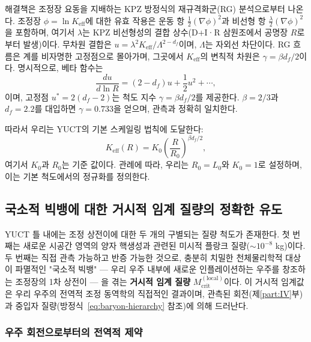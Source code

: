 \documentclass[11pt,a4paper]{article}
\newcommand{\Keff}{K_{\mathrm{eff}}}
\newcommand{\Lzero}{L_0}
\begin{document}
	해결책은 조정장 요동을 지배하는 KPZ 방정식의 재규격화군(RG) 분석으로부터 나온다. 조정장 \(\phi = \ln \Keff\)에 대한 유효 작용은 운동 항 \(\frac{1}{2}(\nabla \phi)^2\)과 비선형 항 \(\frac{\lambda}{2}(\nabla \phi)^2\)을 포함하며, 여기서 \(\lambda\)는 KPZ 비선형성의 결합 상수(D+I·R 삼원조에서 공명장 \(R\)로부터 발생)이다. 무차원 결합은 \(u = \lambda^2 \Keff / \Lambda^{2-d_f}\)이며, \(\Lambda\)는 자외선 차단이다. RG 흐름은 계를 비자명한 고정점으로 몰아가며, 그곳에서 \(\Keff\)의 변칙적 차원은 \(\gamma = \beta d_f / 2\)이다. 명시적으로, 베타 함수는
	\[
	\frac{du}{d\ln R} = (2 - d_f) u + \frac{1}{2} u^2 + \cdots,
	\]
	이며, 고정점 \(u^* = 2(d_f - 2)\)는 척도 지수 \(\gamma = \beta d_f / 2\)를 제공한다. \(\beta = 2/3\)과 \(d_f = 2.2\)를 대입하면 \(\gamma = 0.733\)을 얻으며, 관측과 정확히 일치한다.
	
	따라서 우리는 YUCT의 기본 스케일링 법칙에 도달한다:
	\begin{equation}
		\Keff(R) = K_0 \left( \frac{R}{R_0} \right)^{\beta d_f / 2},
		\label{eq:keff-scaling}
	\end{equation}
	여기서 \(K_0\)과 \(R_0\)는 기준 값이다. 관례에 따라, 우리는 \(R_0 = \Lzero\)와 \(K_0 = 1\)로 설정하며, 이는 기본 척도에서의 정규화를 정의한다.
	
	\subsection{국소적 빅뱅에 대한 거시적 임계 질량의 정확한 유도}
	\label{subsec:Mcrit-macroscopic}
	
	YUCT 틀 내에는 조정 상전이에 대한 두 개의 구별되는 질량 척도가 존재한다. 첫 번째는 새로운 시공간 영역의 양자 핵생성과 관련된 미시적 플랑크 질량(\(\sim 10^{-8}\) kg)이다. 두 번째는 직접 관측 가능하고 반증 가능한 것으로, 충분히 치밀한 천체물리학적 대상이 파멸적인 "국소적 빅뱅" — 우리 우주 내부에 새로운 인플레이션하는 우주를 창조하는 조정장의 1차 상전이 — 을 겪는 \textbf{거시적 임계 질량} \(M_{\mathrm{crit}}^{\mathrm{(local)}}\)이다. 이 거시적 임계값은 우리 우주의 전역적 조정 동역학의 직접적인 결과이며, 관측된 회전(제\ref{part:IV}부)과 중입자 질량(방정식~\ref{eq:baryon-hierarchy} 참조)에 의해 드러난다.
	
	\subsubsection{우주 회전으로부터의 전역적 제약}
	
\end{document}
